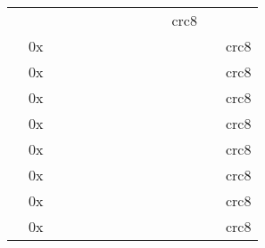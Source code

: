 \documentclass[a4paper]{article}
\begin{document}
\begin{landscape}
\begin{footnotesize}
\begin{tabular}{lllllllllllll}
     &
     &
     &
     &
     &
     &
     &
     &
     &
     &
    crc8 \\
 &
    0x &
     &
     &
     &
     &
     &
     &
     &
     &
     &
     &
    crc8 \\
 &
    0x &
     &
     &
     &
     &
     &
     &
     &
     &
     &
     &
    crc8 \\
 &
    0x &
     &
     &
     &
     &
     &
     &
     &
     &
     &
     &
    crc8 \\
 &
    0x &
     &
     &
     &
     &
     &
     &
     &
     &
     &
     &
    crc8 \\
 &
    0x &
     &
     &
     &
     &
     &
     &
     &
     &
     &
     &
    crc8 \\
 &
    0x &
     &
     &
     &
     &
     &
     &
     &
     &
     &
     &
    crc8 \\
 &
    0x &
     &
     &
     &
     &
     &
     &
     &
     &
     &
     &
    crc8 \\
 &
    0x &
     &
     &
     &
     &
     &
     &
     &
     &
     &
     &
    crc8 \\

\end{tabular}
\end{footnotesize}
\end{landscape}
\end{document}
